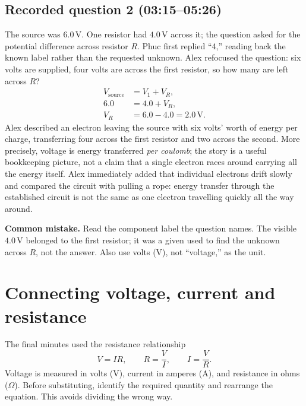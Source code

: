 \documentclass[11pt,a4paper]{article}
\newcommand{\trap}[1]{\colorbox{warn}{\parbox{0.96\linewidth}{#1}}}
\begin{document}
\begin{center}
\end{center}

\subsection{Recorded question 2 (03:15--05:26)}
The source was $6.0\,\mathrm{V}$. One resistor had $4.0\,\mathrm{V}$ across it; the question asked for the potential difference across resistor $R$. Phuc first replied ``4,'' reading back the known label rather than the requested unknown. Alex refocused the question: six volts are supplied, four volts are across the first resistor, so how many are left across $R$?
\begin{align*}
V_{\text{source}}&=V_1+V_R,\\
6.0&=4.0+V_R,\\
V_R&=6.0-4.0=\boxed{2.0\,\mathrm{V}}.
\end{align*}
Alex described an electron leaving the source with six volts' worth of energy per charge, transferring four across the first resistor and two across the second. More precisely, voltage is energy transferred \emph{per coulomb}; the story is a useful bookkeeping picture, not a claim that a single electron races around carrying all the energy itself. Alex immediately added that individual electrons drift slowly and compared the circuit with pulling a rope: energy transfer through the established circuit is not the same as one electron travelling quickly all the way around.

\trap{\textbf{Common mistake.} Read the component label the question names. The visible $4.0\,\mathrm{V}$ belonged to the first resistor; it was a given used to find the unknown across $R$, not the answer. Also use volts (V), not ``voltage,'' as the unit.}

\section{Connecting voltage, current and resistance}
The final minutes used the resistance relationship
\[
\boxed{V=IR},\qquad R=\frac{V}{I},\qquad I=\frac{V}{R}.
\]
Voltage is measured in volts (V), current in amperes (A), and resistance in ohms ($\Omega$). Before substituting, identify the required quantity and rearrange the equation. This avoids dividing the wrong way.
\end{document}
